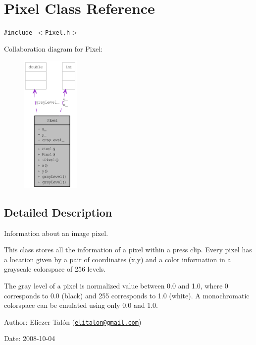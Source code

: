 \hypertarget{class_pixel}{
\section{Pixel Class Reference}
\label{class_pixel}
}
{\tt \#include $<$Pixel.h$>$}

Collaboration diagram for Pixel:\nopagebreak
\begin{figure}[H]
\begin{center}
\leavevmode
\includegraphics[width=80pt]{class_pixel__coll__graph}
\end{center}
\end{figure}


\subsection{Detailed Description}
Information about an image pixel. 

This class stores all the information of a pixel within a press clip. Every pixel has a location given by a pair of coordinates (x,y) and a color information in a grayscale colorspace of 256 levels.

The gray level of a pixel is normalized value between 0.0 and 1.0, where 0 corresponds to 0.0 (black) and 255 corresponds to 1.0 (white). A monochromatic colorspace can be emulated using only 0.0 and 1.0.

\begin{Desc}
\item[Author:]Eliezer Talón (\href{mailto:elitalon@gmail.com}{\tt elitalon@gmail.com}) \end{Desc}
\begin{Desc}
\item[Date:]2008-10-04 \end{Desc}



